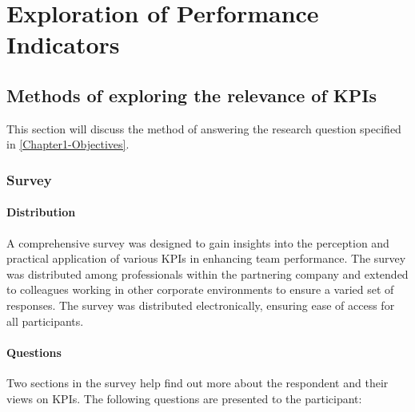 \chapter{Exploration of Performance Indicators} 

\label{Chapter4} 

\section{Methods of exploring the relevance of KPIs}

This section will discuss the method of answering the research question specified in \ref{Chapter1-Objectives}.

\subsection{Survey}

\subsubsection*{Distribution}

A comprehensive survey was designed to gain insights 
into the perception and practical application of various KPIs in 
enhancing team performance. 
The survey was distributed among professionals within the partnering 
company and extended to colleagues working in other corporate 
environments to ensure a varied set of responses.
The survey was distributed electronically, ensuring 
ease of access for all participants. 

\subsubsection*{Questions}

Two sections in the survey help find out more about the respondent and their views on KPIs. 
The following questions are presented to the participant:

